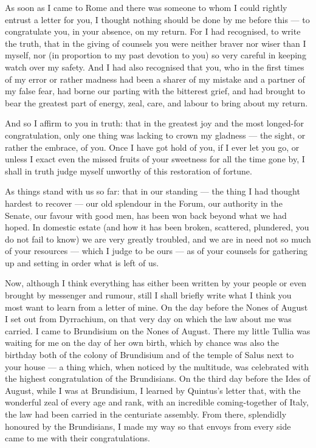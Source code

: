 

 As soon as I came to Rome and there was someone to whom I could rightly entrust a letter for you, I thought nothing should be done by me before this --- to congratulate you, in your absence, on my return. For I had recognised, to write the truth, that in the giving of counsels you were neither braver nor wiser than I myself, nor (in proportion to my past devotion to you) so very careful in keeping watch over my safety. And I had also recognised that you, who in the first times of my error or rather madness had been a sharer of my mistake and a partner of my false fear, had borne our parting with the bitterest grief, and had brought to bear the greatest part of energy, zeal, care, and labour to bring about my return.

 And so I affirm to you in truth: that in the greatest joy and the most longed-for congratulation, only one thing was lacking to crown my gladness --- the sight, or rather the embrace, of you. Once I have got hold of you, if I ever let you go, or unless I exact even the missed fruits of your sweetness for all the time gone by, I shall in truth judge myself unworthy of this restoration of fortune.

 As things stand with us so far: that in our standing --- the thing I had thought hardest to recover --- our old splendour in the Forum, our authority in the Senate, our favour with good men, has been won back beyond what we had hoped. In domestic estate (and how it has been broken, scattered, plundered, you do not fail to know) we are very greatly troubled, and we are in need not so much of your resources --- which I judge to be ours --- as of your counsels for gathering up and setting in order what is left of us.

 Now, although I think everything has either been written by your people or even brought by messenger and rumour, still I shall briefly write what I think you most want to learn from a letter of mine. On the day before the Nones of August I set out from Dyrrachium, on that very day on which the law about me was carried. I came to Brundisium on the Nones of August. There my little Tullia was waiting for me on the day of her own birth, which by chance was also the birthday both of the colony of Brundisium and of the temple of Salus next to your house --- a thing which, when noticed by the multitude, was celebrated with the highest congratulation of the Brundisians. On the third day before the Ides of August, while I was at Brundisium, I learned by Quintus's letter that, with the wonderful zeal of every age and rank, with an incredible coming-together of Italy, the law had been carried in the centuriate assembly. From there, splendidly honoured by the Brundisians, I made my way so that envoys from every side came to me with their congratulations.


